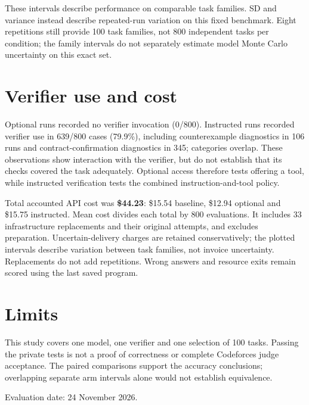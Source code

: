 \documentclass[10pt,a4paper]{article}
\begin{document}
These intervals describe performance on comparable task families. SD and variance instead describe repeated-run variation on this fixed benchmark. Eight repetitions still provide 100 task families, not 800 independent tasks per condition; the family intervals do not separately estimate model Monte Carlo uncertainty on this exact set.

\section*{Verifier use and cost}
Optional runs recorded no verifier invocation (0/800). Instructed runs recorded verifier use in 639/800 cases (79.9\%), including counterexample diagnostics in 106 runs and contract-confirmation diagnostics in 345; categories overlap. These observations show interaction with the verifier, but do not establish that its checks covered the task adequately. Optional access therefore tests offering a tool, while instructed verification tests the combined instruction-and-tool policy.

Total accounted API cost was \textbf{\$44.23}: \$15.54 baseline, \$12.94 optional and \$15.75 instructed. Mean cost divides each total by 800 evaluations. It includes 33 infrastructure replacements and their original attempts, and excludes preparation. Uncertain-delivery charges are retained conservatively; the plotted intervals describe variation between task families, not invoice uncertainty. Replacements do not add repetitions. Wrong answers and resource exits remain scored using the last saved program.

\section*{Limits}
This study covers one model, one verifier and one selection of 100 tasks. Passing the private tests is not a proof of correctness or complete Codeforces judge acceptance. The paired comparisons support the accuracy conclusions; overlapping separate arm intervals alone would not establish equivalence.

\vfill
{\footnotesize Evaluation date: 24 November 2026.}
\end{document}
